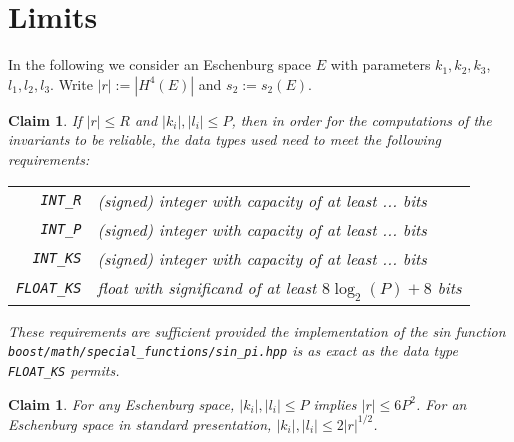\documentclass{article}
\newtheorem{claim}[thm]{Claim}
\newcommand{\abs}[1]{\left|#1\right|}
\begin{document}
\section*{Limits}
In the following we consider an Eschenburg space \(E\) with parameters \(k_1,k_2,k_3\), \(l_1,l_2,l_3\).  Write \(\abs{r} := |H^4(E)|\) and \(s_2 := s_2(E)\).

\begin{claim}\label{claim:bits}
  If \(\abs{r} \leq R\) and \(\abs{k_i},\abs{l_i} \leq P\), then in order for the computations of the invariants to be reliable, the data types used need to meet the following requirements:
  \begin{center}
    \begin{tabular}{rp{\linewidth-5em}}
      \verb+INT_R+ & (signed) integer with capacity of at least ... bits \\
      \verb+INT_P+ & (signed) integer with capacity of at least ... bits \\
      \verb+INT_KS+ & (signed) integer with capacity of at least ... bits \\
      \verb+FLOAT_KS+ & float with significand of at least \(8\log_2(P)+8\) bits
    \end{tabular}
  \end{center}
  These requirements are sufficient provided the implementation of the sin function  \verb+boost/math/special_functions/sin_pi.hpp+
  is as exact as the data type \verb+FLOAT_KS+ permits.
\end{claim}

\begin{claim}\label{lem:P-vs-R}
  For any Eschenburg space, 
  \(\abs{k_i}, \abs{l_i} \leq P\) implies \(\abs{r} \leq 6 P^2\).
  For an Eschenburg space in standard presentation, \(\abs{k_i}, \abs{l_i} \leq 2\abs{r}^{1/2}\).
\end{claim}
\end{document}

